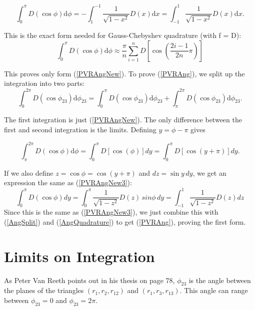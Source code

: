 \documentclass[Dissertation.tex]{subfiles}
\begin{document}
\begin{equation}
\int_0^\pi  D\left( {\cos \phi } \right){\textrm{d}}\phi = - \int_1^{ - 1} \frac{1}{{\sqrt {1 - {x^2}} }}D\left( x \right){\textrm{d}}x = \int_{ - 1}^1 \frac{1}{{\sqrt {1 - {x^2}} }}D\left( x \right){\textrm{d}}x.
\label{PVRAngNew3}
\end{equation}

This is the exact form needed for Gauss-Chebyshev quadrature (with f = D):
\begin{equation}
\int_0^\pi  D\left( {\cos \phi } \right){\textrm{d}}\phi \approx \frac{\pi }{n} \sum_{i = 1}^n D\!\left[ {\cos \left( {\frac{{2i - 1}}{{2n}}\pi } \right)} \right]
\label{AngQuadrature}
\end{equation}

This proves only form (\ref{PVRAngNew}). To prove (\ref{PVRAng}), we split up the integration into two parts:
\begin{equation}
\int_0^{2\pi } D\left( {\cos {\phi _{23}}} \right){\textrm{d}}{\phi _{23}} = \int_0^\pi  D\left( {\cos {\phi _{23}}} \right){\textrm{d}}{\phi _{23}} + \int _\pi ^{2\pi } D\left( {\cos {\phi _{23}}} \right){\textrm{d}}{\phi _{23}}.
\label{AngSplit}
\end{equation}

The first integration is just (\ref{PVRAngNew}). The only difference between the first and second integration is the limits. Defining $y = \phi - \pi$ gives

\begin{equation}
\int _\pi ^{2\pi } D\left( {\cos {\phi}} \right){\textrm{d}}{\phi} = \int_0^\pi D\left[\cos(\phi)\right] dy = \int_0^\pi D\left[\cos(y+\pi)\right] dy.
\end{equation}

If we also define $z = \cos \phi = \cos(y+\pi)$ and $dz = \sin y \,dy$, we get an expression the same as (\ref{PVRAngNew3}):
\begin{equation}
\int_0^\pi D\left(\cos\phi\right) dy = \int_0^\pi \frac{1}{\sqrt{1-z^2}} D(z)\, sin\phi\, dy = \int_{-1}^1 \frac{1}{\sqrt{1-z^2}} D(z) dz
\end{equation}
Since this is the same as (\ref{PVRAngNew3}), we just combine this with (\ref{AngSplit}) and (\ref{AngQuadrature}) to get (\ref{PVRAng}), proving the first form.


\section{Limits on Integration}
As Peter Van Reeth points out in his thesis on page 78, $\phi_{23}$ is the angle between the planes of the triangles $(r_1,r_2,r_{12})$ and $(r_1,r_3,r_{13})$. This angle can range between $\phi_{23} = 0$ and $\phi_{23} = 2 \pi$.
\end{document}
